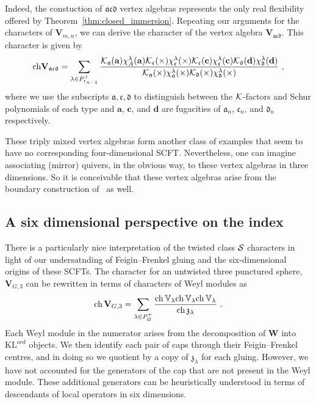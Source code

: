 \documentclass[a4paper]{article}
\def\IV{\mathbb{V}}
\def\KK{{\cal K}}
\def\SS{{\cal S}}
\def\ch{{\rm ch}}
\def\af{\mathfrak{a}}
\def\ccf{\mathfrak{c}}
\def\df{\mathfrak{d}}
\def \zf{\mathfrak{z}}
\def \KL{\mathrm{KL}}
\def\W{\mathbf{W}}
\def\V{\mathbf{V}}
\begin{document}
Indeed, the constuction of $\af\ccf\df$ vertex algebras represents the only real flexibility offered by Theorem~\ref{thm:closed_immersion}. Repeating our arguments for the characters of $\V_{m,n}$, we can derive the character of the vertex algebra $\V_{\af\ccf\df}$. This character is given by
\begin{equation}
	\ch\V_{\af\ccf\df}	= \sum_{\lambda\in P_{{\mathfrak c}_{n-1}}^+}\frac{\KK_\af(\mathbf{a})\chi^\lambda_A(\mathbf{a})\KK_\ccf(\times)\chi^\lambda_\ccf(\times)\KK_\ccf(\mathbf{c})\chi^\lambda_\ccf(\mathbf{c})\KK_\df(\mathbf{d})\chi^\lambda_\df(\mathbf{d})}{\KK_\af(\times)\chi^\lambda_\af(\times)\KK_\df(\times)\chi^\lambda_\df(\times)}~,
\end{equation}
where we use the subscripts $\af,{\mathfrak c},\df$ to distinguish between the $\KK$-factors and Schur polynomials of each type and $\mathbf{a}$, $\mathbf{c}$, and $\mathbf{d}$ are fugacities of $\af_n$, ${\mathfrak c}_n$, and $\df_n$ respectively.

These triply mixed vertex algebras form another class of examples that seem to have no corresponding four-dimensional SCFT. Nevertheless, one can imagine associating (mirror) quivers, in the obvious way, to these vertex algebras in three dimensions. So it is conceivable that these vertex algebras arise from the boundary construction of~\cite{Gaiotto:2016wcv,Costello:2018swh,Costello:2019} as well.

\subsection{\label{ssec:fixtures/new-perspective}A six dimensional perspective on the index}

There is a particularly nice interpretation of the twisted class $\SS$ characters in light of our undersatnding of Feigin--Frenkel gluing and the six-dimensional origins of these SCFTs. The character for an untwisted three punctured sphere, $\V_{G,3}$ can be rewritten in terms of characters of Weyl modules as
\begin{equation}
	\ch \, \V_{G,3} = \sum_{\lambda \in P_G^+} \frac{ \ch \, \IV_\lambda \ch \, \IV_\lambda\ch \, \IV_\lambda}{\ch \, \zf_\lambda}~.
\end{equation}
Each Weyl module in the numerator arises from the decomposition of $\W$ into $\KL^{ord}$ objects. We then identify each pair of caps through their Feigin--Frenkel centres, and in doing so we quotient by a copy of $\zf_\lambda$ for each gluing. However, we have not accounted for the generators of the cap that are not present in the Weyl module. These additional generators can be heuristically understood in terms of descendants of local operators in six dimensions.
\end{document}

